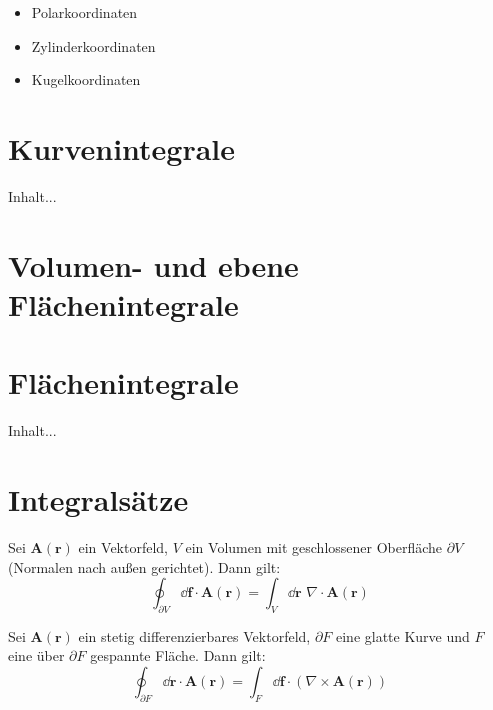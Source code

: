 \begin{framedprop}
	\begin{itemize}
		\item Polarkoordinaten
		\item Zylinderkoordinaten
		\item Kugelkoordinaten
	\end{itemize}
\end{framedprop}

\section{Kurvenintegrale}

\begin{framedprop}
	Inhalt...
\end{framedprop}

\begin{framedthm}

\end{framedthm}

\section{Volumen- und ebene Flächenintegrale}

\section{Flächenintegrale}

\begin{framedprop}[Parametrisierung]
	Inhalt...
\end{framedprop}

\section{Integralsätze}

\begin{framedthm}
	Sei $\mathbf{A}(\mathbf{r})$ ein Vektorfeld, $V$ ein Volumen mit geschlossener Oberfläche $\partial V$ (Normalen nach außen gerichtet). Dann gilt:
	\[
	\oint_{\partial V} \dd \mathbf{f} \cdot \mathbf{A}(\mathbf{r}) = \int_{V} \dd \mathbf{r} \,\, \nabla \cdot \mathbf{A}(\mathbf{r}) 
	\] 
\end{framedthm}

\begin{framedthm}
	Sei $\mathbf{A}(\mathbf{r})$ ein stetig differenzierbares Vektorfeld, $\partial F$ eine glatte Kurve und $F$ eine über $\partial F$ gespannte Fläche. Dann gilt:
	\[
	\oint_{\partial F} \dd \mathbf{r} \cdot \mathbf{A}(\mathbf{r}) = \int_F \dd \mathbf{f} \cdot (\nabla \times \mathbf{A}(\mathbf{r}))
	\]
\end{framedthm}


